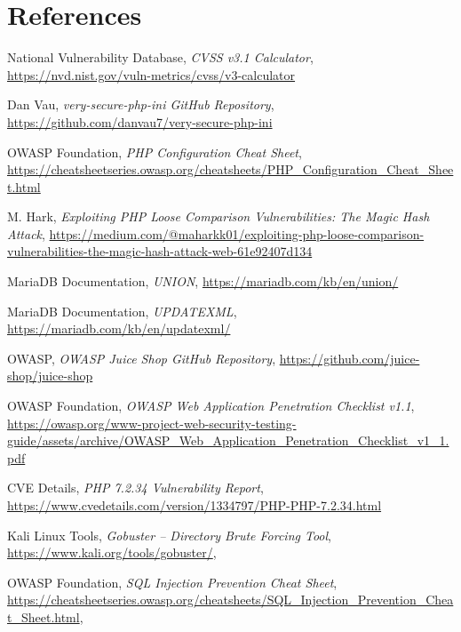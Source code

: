 \documentclass[12pt]{article}
\begin{document}
\section{References}
\begin{thebibliography}{10}

National Vulnerability Database, 
\textit{CVSS v3.1 Calculator}, 
\url{https://nvd.nist.gov/vuln-metrics/cvss/v3-calculator}

Dan Vau,
\textit{very-secure-php-ini GitHub Repository}, 
\url{https://github.com/danvau7/very-secure-php-ini}

OWASP Foundation,
\textit{PHP Configuration Cheat Sheet}, 
\url{https://cheatsheetseries.owasp.org/cheatsheets/PHP_Configuration_Cheat_Sheet.html}

M. Hark,
\textit{Exploiting PHP Loose Comparison Vulnerabilities: The Magic Hash Attack}, 
\url{https://medium.com/@maharkk01/exploiting-php-loose-comparison-vulnerabilities-the-magic-hash-attack-web-61e92407d134}

MariaDB Documentation,
\textit{UNION}, 
\url{https://mariadb.com/kb/en/union/}

MariaDB Documentation,
\textit{UPDATEXML}, 
\url{https://mariadb.com/kb/en/updatexml/}

OWASP,
\textit{OWASP Juice Shop GitHub Repository}, 
\url{https://github.com/juice-shop/juice-shop}

OWASP Foundation,
\textit{OWASP Web Application Penetration Checklist v1.1}, 
\url{https://owasp.org/www-project-web-security-testing-guide/assets/archive/OWASP_Web_Application_Penetration_Checklist_v1_1.pdf}

CVE Details,
\textit{PHP 7.2.34 Vulnerability Report}, 
\url{https://www.cvedetails.com/version/1334797/PHP-PHP-7.2.34.html}

Kali Linux Tools,  
\textit{Gobuster – Directory Brute Forcing Tool},  
\url{https://www.kali.org/tools/gobuster/},

OWASP Foundation,  
\textit{SQL Injection Prevention Cheat Sheet},  
\url{https://cheatsheetseries.owasp.org/cheatsheets/SQL_Injection_Prevention_Cheat_Sheet.html},  

\end{thebibliography}


\appendix
\end{document}
